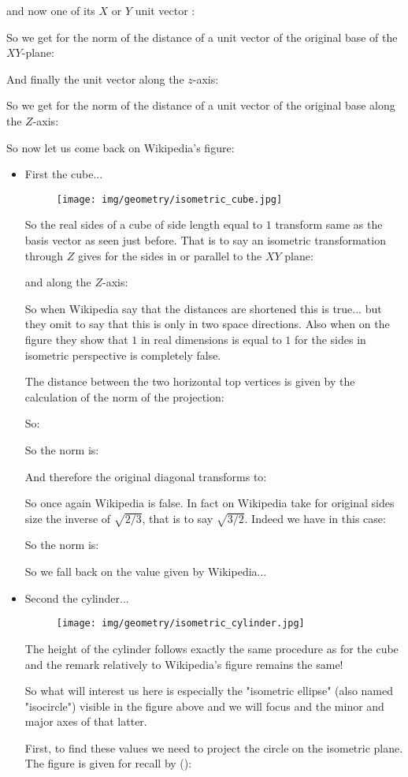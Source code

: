 	and now one of its $X$ or $Y$ unit vector :
	
	So we get for the norm of the distance of a unit vector of the original base of the $XY$-plane:
	
	And finally the unit vector along the $z$-axis:
	
	So we get for the norm of the distance of a unit vector of the original base along the $Z$-axis:
	
	
	\pagebreak
	So now let us come back on Wikipedia's figure:
	\begin{itemize}
		\item First the cube... 
		\begin{figure}[H]
			\centering
			\texttt{[image: img/geometry/isometric\_cube.jpg]}
		\end{figure}
		So the real sides of a cube of side length equal to $1$ transform same as the basis vector as seen just before. That is to say an isometric transformation through $Z$ gives for the sides in or parallel to the $XY$ plane:
		
		and along the $Z$-axis:
		
		So when Wikipedia say that the distances are shortened this is true... but they omit to say that this is only in two space directions. Also when on the figure they show that $1$ in real dimensions is equal to $1$ for the sides in isometric perspective is completely false.
		
		The distance between the two horizontal top vertices is given by the calculation of the norm of the projection:
		
		So:
		
		So the norm is:
		
		And therefore the original diagonal transforms to:
		
		So once again Wikipedia is false. In fact on Wikipedia take for original sides size the inverse of $\sqrt{2/3}$, that is to say $\sqrt{3/2}$. Indeed we have in  this case:
		
		So the norm is:
		
		So we fall back on the value given by Wikipedia...
		
		
		\item Second the cylinder...
		\begin{figure}[H]
			\centering
			\texttt{[image: img/geometry/isometric\_cylinder.jpg]}
		\end{figure}
		The height of the cylinder follows exactly the same procedure as for the cube and the remark relatively to Wikipedia's figure remains the same! 
		
		So what will interest us here is especially the "isometric ellipse" (also named "isocircle") visible in the figure above and we will focus and the minor and major axes of that latter. 
		
		First, to find these values we need to project the circle on the isometric plane. The figure is given for recall by ():
		
	\end{itemize}
	
